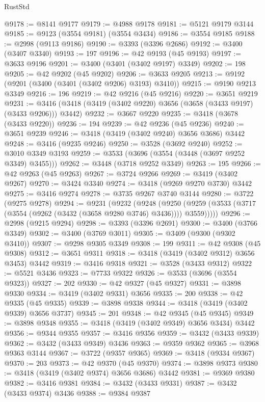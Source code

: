 \begin{lexlean}{RustStd}
\begin{coremodule}
@9178 := @8141 @9177
@9179 := @4988 @9178
@9181 := @5121 @9179 @3144
@9185 := @9123 (@3554 @9181) (@3554 @3434)
@9186 := @3554 @9185
@9188 := @2998 (@9113 @9186)
@9190 := @3393 (@3396 @2686)
@9192 := @3400 (@3407 @3340)
@9193 := 197
@9196 := @42 @9193 (@45 @9193)
@9197 := @3633 @9196
@9201 := @3400 (@3401 (@3402 @9197) @3349)
@9202 := 198
@9205 := @42 @9202 (@45 @9202)
@9206 := @3633 @9205
@9213 := @9192 (@9201 (@3400 (@3401 (@3402 @9206) @3193) @3410))
@9215 := @9190 @9213 @3349
@9216 := 196
@9219 := @42 @9216 (@45 @9216)
@9220 := @3651 @9219
@9231 := @3416 (@3418 (@3419 (@3402 @9220) @3656 (@3658 (@3433 @9197) (@3433 @9206))) @3442)
@9232 := @3667 @9220
@9235 := @3418 (@3678 (@3433 @9220))
@9236 := 194
@9239 := @42 @9236 (@45 @9236)
@9240 := @3651 @9239
@9246 := @3418 (@3419 (@3402 @9240) @3656 @3686) @3442
@9248 := @3416 (@9235 @9246)
@9250 := @3528 (@3692 @9240)
@9252 := @3010 @3349 @3193
@9259 := @3533 (@3696 (@3554 (@3448 (@3697 @9252 @3349) @3455)))
@9262 := @3448 (@3718 @9252 @3349)
@9263 := 195
@9266 := @42 @9263 (@45 @9263)
@9267 := @3724 @9266
@9269 := @3419 (@3402 @9267)
@9270 := @3424 @3340
@9274 := @3418 (@9269 @9270 @3730) @3442
@9275 := @3416 @9274
@9278 := @3735 @9267 @3740 @3144
@9280 := @3722 (@9275 @9278)
@9294 := @9231
    (@9232
      (@9248
        (@9250 (@9259 (@3533 (@3717 (@3554 (@9262 (@3432 (@3658 @9280 @3746) @3436)))) @3559)))))
@9296 := @2998 (@9215 @9294)
@9298 := @3393 (@3396 @2691)
@9300 := @3400 (@3766 @3349)
@9302 := @3400 (@3769 @3011)
@9305 := @3409 (@9300 (@9302 @3410))
@9307 := @9298 @9305 @3349
@9308 := 199
@9311 := @42 @9308 (@45 @9308)
@9312 := @3651 @9311
@9318 := @3418 (@3419 (@3402 @9312) @3656 @3453) @3442
@9319 := @3416 @9318
@9321 := @3528 (@3433 @9312)
@9322 := @5521 @3436
@9323 := @7733 @9322
@9326 := @3533 (@3696 (@3554 @9323))
@9327 := 202
@9330 := @42 @9327 (@45 @9327)
@9331 := @3898 @9330
@9334 := @3419 (@3402 @9331) @3656
@9335 := 200
@9338 := @42 @9335 (@45 @9335)
@9339 := @3898 @9338
@9344 := @3418 (@3419 (@3402 @9339) @3656 @3737)
@9345 := 201
@9348 := @42 @9345 (@45 @9345)
@9349 := @3898 @9348
@9355 := @3418 (@3419 (@3402 @9349) @3656 @3434) @3442
@9356 := @9344 @9355
@9357 := @3416 @9356
@9359 := @3432 (@3433 @9339)
@9362 := @3432 (@3433 @9349) @3436
@9363 := @9359 @9362
@9365 := @3968 @9363 @3144
@9367 := @3722 (@9357 @9365)
@9369 := @3418 (@9334 @9367)
@9370 := 203
@9373 := @42 @9370 (@45 @9370)
@9374 := @3898 @9373
@9380 := @3418 (@3419 (@3402 @9374) @3656 @3686) @3442
@9381 := @9369 @9380
@9382 := @3416 @9381
@9384 := @3432 (@3433 @9331)
@9387 := @3432 (@3433 @9374) @3436
@9388 := @9384 @9387

\end{coremodule}
\end{lexlean}
